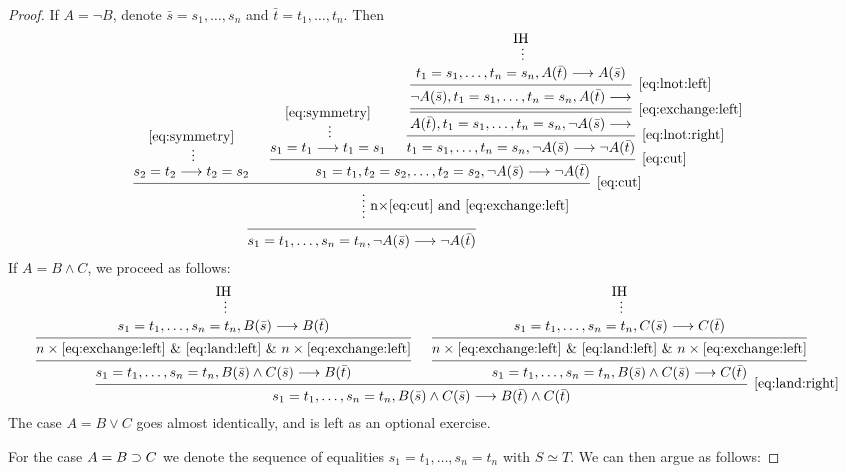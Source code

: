 \documentclass[11pt,a4paper]{article}
\begin{document}
\begin{proof}
    If \(A = \lnot B\), denote \(\bar s = s_1,\ldots,s_n\) and
    \(\bar t = t_1,\ldots,t_n\). Then
    \begin{equation*}
        \begin{prooftree}
            \hypo{\eqref{eq:symmetry}}
            \ellipsis{}{s_2 = t_2 \seq t_2 = s_2}
            \hypo{\eqref{eq:symmetry}}
            \ellipsis{}{s_1=t_1\seq t_1=s_1}
            \hypo{\IH}
            \ellipsis{}{t_1=s_1,\ldots,t_n=s_n,A(\bar t)\seq A(\bar s)}
            \infer1[\eqref{eq:lnot:left}]{\lnot A(\bar s), t_1=s_1,\ldots,t_n=s_n,A(\bar t)\seq}
            \infer[double]1[\eqref{eq:exchange:left}]{A(\bar t), t_1=s_1,\ldots,t_n=s_n,\lnot A(\bar s)\seq}
            \infer1[\eqref{eq:lnot:right}]{t_1=s_1,\ldots,t_n=s_n,\lnot A(\bar s)\seq \lnot A(\bar t)}
            \infer2[\eqref{eq:cut}]{s_1=t_1,t_2=s_2,\ldots,t_2=s_2,\lnot A(\bar s)\seq \lnot A(\bar t)}
            \infer2[\eqref{eq:cut}]{}
            \ellipsis{n×\eqref{eq:cut} and \eqref{eq:exchange:left}}{}
            \infer1{s_1 = t_1, \ldots,s_n=t_n, \lnot A(\bar s) \seq \lnot A(\bar t)}
        \end{prooftree}
    \end{equation*}
    If \(A = B\land C\), we proceed as follows:
    \small
    \begin{equation*}
        \begin{prooftree}
            \hypo{\IH}
            \ellipsis{}{s_1 = t_1, \ldots,s_n=t_n, B(\bar s) \seq B(\bar t)}
            \infer1{n\times\eqref{eq:exchange:left}~\&~\eqref{eq:land:left}~\&~n\times\eqref{eq:exchange:left}}
            \infer1{s_1 = t_1, \ldots,s_n=t_n, B(\bar s)\land C(\bar s) \seq B(\bar t)}
            \hypo{\IH}
            \ellipsis{}{s_1 = t_1, \ldots,s_n=t_n, C(\bar s) \seq C(\bar t)}
            \infer1{n\times\eqref{eq:exchange:left}~\&~\eqref{eq:land:left}~\&~n\times\eqref{eq:exchange:left}}
            \infer1{s_1 = t_1, \ldots,s_n=t_n, B(\bar s)\land C(\bar s) \seq C(\bar t)}
            \infer2[\eqref{eq:land:right}]{s_1 = t_1, \ldots,s_n=t_n, B(\bar s)\land C(\bar s) \seq B(\bar t)\land C(\bar t)}
        \end{prooftree}
    \end{equation*}
    \normalsize
    The case \(A = B\lor C\) goes almost identically, and is left as an optional exercise.

For the case \(A = B\supset C\) we denote the sequence of equalities
\(s_1=t_1,\ldots,s_n=t_n\) with \(S\simeq T\). We can then argue as follows:


\end{proof}
\end{document}
